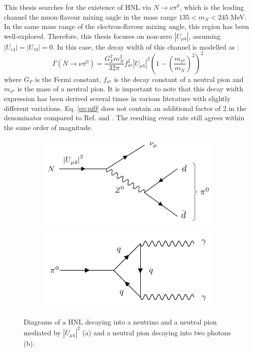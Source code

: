 This thesis searches for the existence of HNL via $N\rightarrow\nu \pi^{0}$, which is the leading channel the muon-flavour mixing angle in the mass range $ 135 < m_{N} < 245 $ MeV.
In the same mass range of the electron-flavour mixing angle, this region has been well-explored.
Therefore, this thesis focuses on non-zero $|U_{\mu4}|$, assuming $|U_{e4}| = |U_{\tau4}| = 0$.  
In this case, the decay width of this channel is modelled as \cite{}:
\begin{equation}
	\Gamma(N\rightarrow \nu \pi^{0}) = \frac{G_{F}^{2}m_{N}^{3}}{32\pi}f^{2}_{\pi^{0}}|U_{\mu4}|^{2}\left(1-\left(\frac{m_{\pi^{0}}}{m_{N}}\right)^{2}\right)^{2}
\label{eq:pi0}
\end{equation}
where $G_{F}$ is the Fermi constant, $f_{\pi^{0}}$ is the decay constant of a neutral pion and $m_{\pi^{0}}$ is the mass of a neutral pion.
It is important to note that this decay width expression has been derived several times in various literature with slightly different variations. 
Eq. \ref{eq:pi0} does not contain an additional factor of 2 in the denominator compared to Ref. \cite{} and \cite{}.
The resulting event rate still agrees within the same order of magnitude.

\begin{figure}[htbp!]
\begin{subfigure}[h]{0.49\linewidth}
\centering    
\includegraphics[width=\linewidth]{N_to_pi0_edit}
\caption{}
\end{subfigure}
\hfill
\begin{subfigure}[h]{0.49\linewidth}
\centering    
\includegraphics[width=\linewidth]{pi0_to_gam}
\caption{}
\end{subfigure}%
\caption[decayDiagram]{
Diagrams of a HNL decaying into a neutrino and a neutral pion mediated by $|U_{\mu4}|^{2}$ (a) and a neutral pion decaying into two photons (b).
}\label{fig:decayDiagram}
\end{figure}

